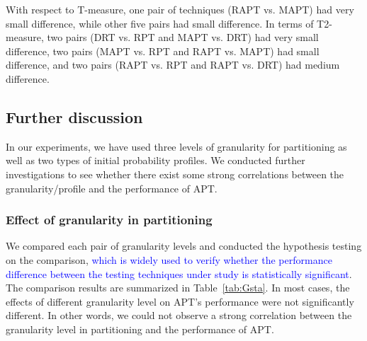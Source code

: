 \documentclass[10pt,journal,compsoc]{IEEEtran}
\begin{document}
With respect to T-measure, one pair of techniques (RAPT vs. MAPT) had very small difference, while other five pairs had small difference. In terms of T2-measure, two pairs (DRT vs. RPT and MAPT vs. DRT) had very small difference, two pairs (MAPT vs. RPT and RAPT vs. MAPT) had small difference, and two pairs (RAPT vs. RPT and RAPT vs. DRT) had medium difference.


\subsection{Further discussion}

In our experiments, we have used three levels of granularity for partitioning as well as two types of initial probability profiles. We conducted further investigations to see whether there exist some strong correlations between the granularity/profile and the performance of APT.

\subsubsection{Effect of granularity in partitioning}

We compared each pair of granularity levels and conducted the hypothesis testing on the comparison,  \textcolor{blue}{which is widely used to verify whether the performance difference between the testing techniques under study is statistically significant}. The comparison results are summarized in Table~\ref{tab:Gsta}. In most cases, the effects of different granularity level on APT's performance were not significantly different. In other words, we could not observe a strong correlation between the granularity level in partitioning and the performance of APT.

\end{document}
